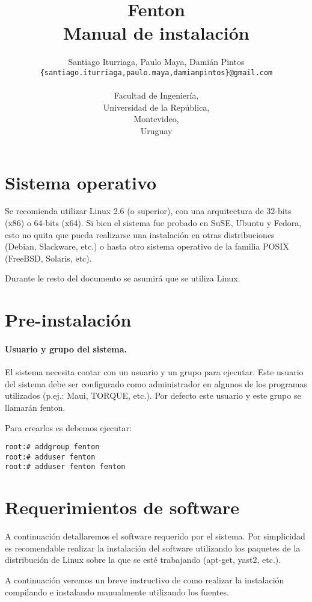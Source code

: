 \documentclass[a4paper,10pt,spanish]{article}
\title{Fenton\\Manual de instalaci\'{o}n}
\author{Santiago Iturriaga, Paulo Maya, Dami\'{a}n Pintos\\
\texttt{\{santiago.iturriaga,paulo.maya,damianpintos\}@gmail.com}\\
\\
Facultad de Ingenier\'{i}a,\\
Universidad de la Rep\'{u}blica,\\
Montevideo,\\
Uruguay}
\date{}
\begin{document}
\maketitle
\tableofcontents{}

\section{Sistema operativo}

Se recomienda utilizar Linux 2.6 (o superior), con una arquitectura de 32-bits (x86) o 64-bits (x64). Si bien el sistema fue probado en SuSE, Ubuntu y Fedora, esto no quita que pueda realizarse una instalaci\'{o}n en otras distribuciones (Debian, Slackware, etc.) o hasta otro sistema operativo de la familia POSIX (FreeBSD, Solaris, etc).

Durante le resto del documento se asumir\'{a} que se utiliza Linux.

\section{Pre-instalaci\'{o}n}

\paragraph{Usuario y grupo del sistema.}

El sistema necesita contar con un usuario y un grupo para ejecutar. Este usuario del sistema debe ser configurado como administrador en algunos de los programas utilizados (p.ej.: Maui, TORQUE, etc.). Por defecto este usuario y este grupo se llamar\'{a}n fenton.

Para crearlos es debemos ejecutar:

\begin{verbatim}
root:# addgroup fenton
root:# adduser fenton
root:# adduser fenton fenton
\end{verbatim}

\section{Requerimientos de software}

A continuaci\'{o}n detallaremos el software requerido por el sistema. Por simplicidad es recomendable realizar la instalaci\'{o}n del software utilizando los paquetes de la distribuci\'{o}n de Linux sobre la que se est\'{e} trabajando (apt-get, yast2, etc.).

A continuaci\'{o}n veremos un breve instructivo de como realizar la instalaci\'{o}n compilando e instalando manualmente utilizando los fuentes.
\end{document}
